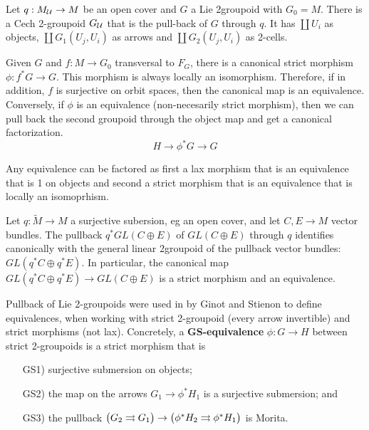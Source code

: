 \begin{example}
Let $q: M_\mathcal U\to M$ be an open cover and $G$ a Lie 2groupoid with $G_0 = M$.
There is a Cech 2-groupoid $G_\mathcal U$ that is the pull-back of $G$ through $q$.
It has $\coprod U_i$ as objects, $\coprod G_1(U_j,U_i)$ as arrows and $\coprod G_2(U_j,U_i)$ as 2-cells. 
\end{example}

Given $G$ and $f:M\to G_0$ transversal to $F_G$, there is a canonical strict morphism $\phi:f^*G\to G$. This morphism is always locally an isomorphism. Therefore, if in addition, $f$ is surjective on orbit spaces, then the canonical map is an equivalence. Conversely, if $\phi$ is an equivalence (non-necesarily strict morphism), then we can pull back the second groupoid through the object map and get a canonical factorization.
$$H\to \phi^*G\to G$$

\begin{lemma}
Any equivalence can be factored as first a lax morphism that is an equivalence that is 1 on objects and second a strict morphism that is an equivalence that is locally an isomoprhism.
\end{lemma}

\begin{example}
Let $q:\tilde M\to M$ a surjective subersion, eg an open cover, and let $C,E\to M$ vector bundles.
The pullback $q^*GL(C\oplus E)$ of $GL(C\oplus E)$ through $q$ identifies canonically with the general linear 2groupoid of the pullback vector bundles: $GL(q^*C\oplus q^*E)$. In particular, the canonical map $GL(q^*C\oplus q^*E)\to GL(C\oplus E)$ is a strict morphism and an equivalence.
\end{example}

Pullback of Lie 2-groupoids were used in \cite{gs15} by Ginot and Stienon to define equivalences, when working with strict 2-groupoid (every arrow invertible) and strict morphisms (not lax). Concretely, a {\bf GS-equivalence} $\phi:G\to H$ between strict 2-groupoids is a strict morphism that is
\begin{enumerate}
\item[GS1)] surjective submersion on objects;
\item[GS2)] the map on the arrows $G_1\to \phi^*H_1$ is a surjective submersion; and
\item[GS3)] the pullback $ \big( G_2\rightrightarrows G_1 \big) \to \big( \phi^*H_2\rightrightarrows \phi^*H_1 \big) $ is Morita.
\end{enumerate}

